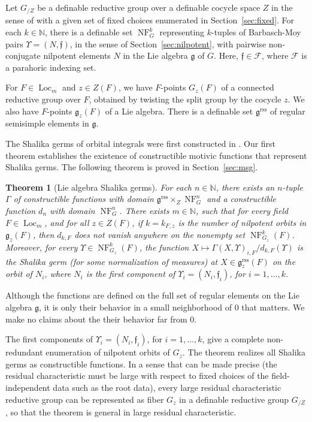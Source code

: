 \documentclass[12pt]{amsart}
\newcommand{\op}[1]{\operatorname{#1}}
\newcommand{\ring}[1]{{\mathbb #1}}
\def\NF{\op{NF}}
\def\Y{\Upsilon}
\def\s{{\mathfrak{f}}}
\newcommand{\cF}{\mathcal{F}}
\newcommand{\fg}{\mathfrak{g}}
\newcommand{\reg}{\mathrm{rss}}
\theoremstyle{plain}
\newtheorem{theorem}[thm]{Theorem}
\theoremstyle{definition}
\begin{document}
Let $G_{/Z}$ be a definable reductive group over a definable cocycle
space $Z$ in the sense of \cite{CGH} with a given set of fixed choices
enumerated in Section~\ref{sec:fixed}.  For each $k\in\ring{N}$, there
is a definable set $\NF^k_G$ representing $k$-tuples of Barbasch-Moy
pairs $\Y=(N,\s)$, in the sense of Section~\ref{sec:nilpotent}, with
pairwise non-conjugate nilpotent elements $N$ in the Lie algebra $\fg$
of $G$.  Here, $\s\in\cF$, where $\cF$ is a parahoric indexing set.

For $F\in \op{Loc}_m$ and $z\in Z(F)$, we have $F$-points $G_z(F)$ of
a connected reductive group over $F$, obtained by twisting the split
group by the cocycle $z$. We also have $F$-points $\fg_z(F)$ of a Lie
algebra. There is a definable set $\fg^\reg$ of regular semisimple
elements in $\fg$.  

The Shalika germs of orbital integrals were first constructed in
\cite{shalika1972theorem}.  Our first theorem establishes the
existence of constructible motivic functions that represent Shalika
germs.  The following theorem is proved in Section~\ref{sec:msg}.




\begin{theorem} [Lie algebra Shalika germs]\label{thm:lie-shalika} 
  For each $n\in \ring{N}$, there exists an $n$-tuple $\Gamma$ of
  constructible functions with domain $\fg^\reg\times_Z \NF^n_G$ and a
  constructible function $d_n$ with domain $\NF^n_G$.  There exists
  $m\in \ring{N}$, such that for every field $F\in \op{Loc}_{m}$, and
  for all $z\in Z(F)$, if $k=k_{F,z}$ is the number of nilpotent
  orbits in $\fg_z(F)$, then $d_{k,F}$ does not vanish anywhere on the
  nonempty set $\NF^{k}_{G_z}(F)$.  Moreover, for every $\Y\in
  \NF^{k}_{G_z}(F)$, the function $X\mapsto
  \Gamma(X,\Y)_{i,F}/d_{k,F}(\Y)$ is the Shalika germ (for some
  normalization of measures) at $X\in \fg^\reg_z(F)$ on the orbit of
  $N_i$, where $N_i$ is the first component of $\Y_i=(N_i,\s_i)$, for
  $i=1,\ldots,k$.
\end{theorem}

Although the functions are defined on the full set of regular elements
on the Lie algebra $\fg$, it is only their behavior in a small
neighborhood of $0$ that matters.  We make no claims about the their
behavior far from $0$.

The first components of $\Y_i=(N_i,\s_i)$, for $i=1,\ldots,k$, give a
complete non-redundant enumeration of nilpotent orbits of $G_z$.  The
theorem realizes all Shalika germs as constructible functions.  In a
sense that can be made precise (the residual characteristic must be
large with respect to fixed choices of the field-independent data such
as the root data), every large residual characteristic reductive group
can be represented as fiber $G_z$ in a definable reductive group $G_{/Z}$,
so that the theorem is general in large residual characteristic.
\end{document}

